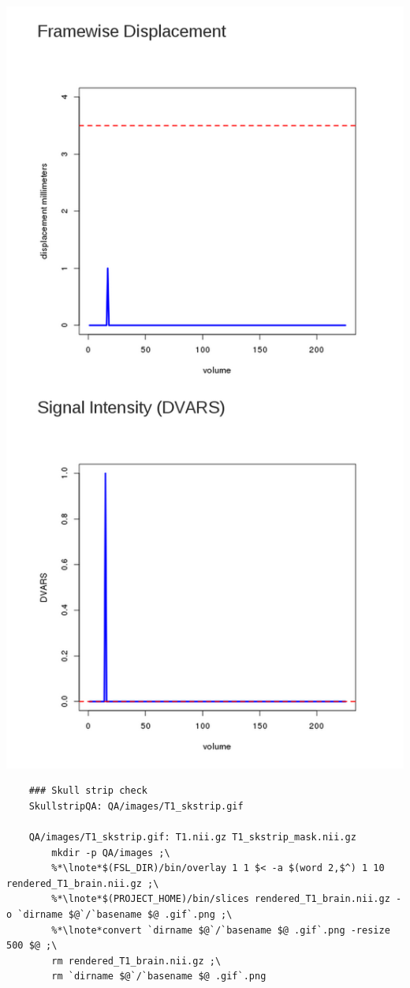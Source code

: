 \includegraphics[scale=0.3]{QAmotion2.png}

\begin{lstlisting}
	### Skull strip check
	SkullstripQA: QA/images/T1_skstrip.gif

	QA/images/T1_skstrip.gif: T1.nii.gz T1_skstrip_mask.nii.gz
		mkdir -p QA/images ;\
		%*\lnote*$(FSL_DIR)/bin/overlay 1 1 $< -a $(word 2,$^) 1 10 rendered_T1_brain.nii.gz ;\
		%*\lnote*$(PROJECT_HOME)/bin/slices rendered_T1_brain.nii.gz -o `dirname $@`/`basename $@ .gif`.png ;\
		%*\lnote*convert `dirname $@`/`basename $@ .gif`.png -resize 500 $@ ;\
		rm rendered_T1_brain.nii.gz ;\
		rm `dirname $@`/`basename $@ .gif`.png

\end{lstlisting}
\\

